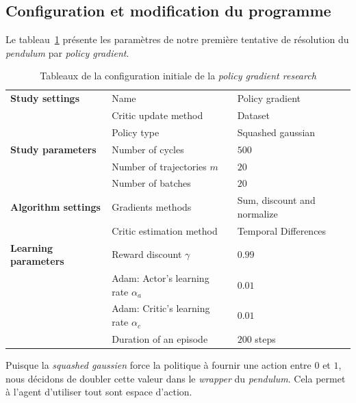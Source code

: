 \subsection{Configuration et modification du programme}

Le tableau~\ref{tab:initial_settings} présente les paramètres de notre première tentative de résolution du \emph{pendulum} par \emph{policy gradient}.

\begin{table}[H]
        \centering
        \begin{tabular}{@{}l l l@{}}
            \toprule
            \textbf{Study settings} & Name & Policy gradient \\
            & Critic update method & Dataset \\
            & Policy type & Squashed gaussian \\ \midrule
            \textbf{Study parameters} & Number of cycles & $ 500 $ \\
            & Number of trajectories $ m $ & $ 20 $ \\
            & Number of batches & $ 20 $ \\ \midrule
            \textbf{Algorithm settings} & Gradients methods & Sum, discount and normalize \\
            & Critic estimation method & Temporal Differences \\ \midrule
            \textbf{Learning parameters} & Reward discount $ \gamma $ & $ 0.99 $ \\
            & Adam: Actor's learning rate $ \alpha_{a} $ & $ 0.01 $ \\
            & Adam: Critic's learning rate $ \alpha_{c} $ & $ 0.01 $ \\
            & Duration of an episode & $ 200 $ steps \\
            \bottomrule
        \end{tabular}
    \caption{Tableaux de la configuration initiale de la \emph{policy gradient research}}\label{tab:initial_settings}
\end{table}

Puisque la \emph{squashed gaussien} force la politique à fournir une action entre  $ 0 $ et $ 1 $, nous décidons de doubler cette valeur dans le \emph{wrapper} du \emph{pendulum}. Cela permet à l'agent d'utiliser tout sont espace d'action.

